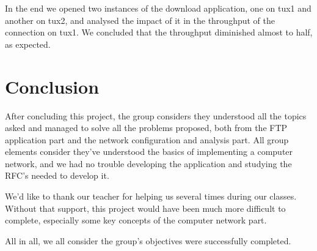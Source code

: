\documentclass[11pt,a4paper,reqno]{article}
\numberwithin{equation}{section}
\begin{document}
In the end we opened two instances of the download application, one on tux1 and another on tux2, and analysed the impact of it in the throughput of the connection on tux1. We concluded that the throughput diminished almost to half, as expected.

\section{Conclusion}

After concluding this project, the group considers they understood all the topics asked and managed to solve all the problems proposed, both from the FTP application part and the network configuration and analysis part. All group elements consider they've understood the basics of implementing a computer network, and we had no trouble developing the application and studying the RFC's needed to develop it. 

We'd like to thank our teacher for helping us several times during our classes. Without that support, this project would have been much more difficult to complete, especially some key concepts of the computer network part.

All in all, we all consider the group's objectives were successfully completed.

\newpage
\end{document}
